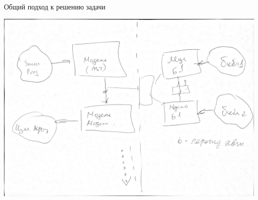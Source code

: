 \documentclass[12pt]{beamer}
\begin{document}
\begin{frame}{Общий подход к решению задачи}
\begin{center}
\includegraphics[width=\textwidth]{img-0001.png}
\end{center}
\end{frame}

\end{document}
